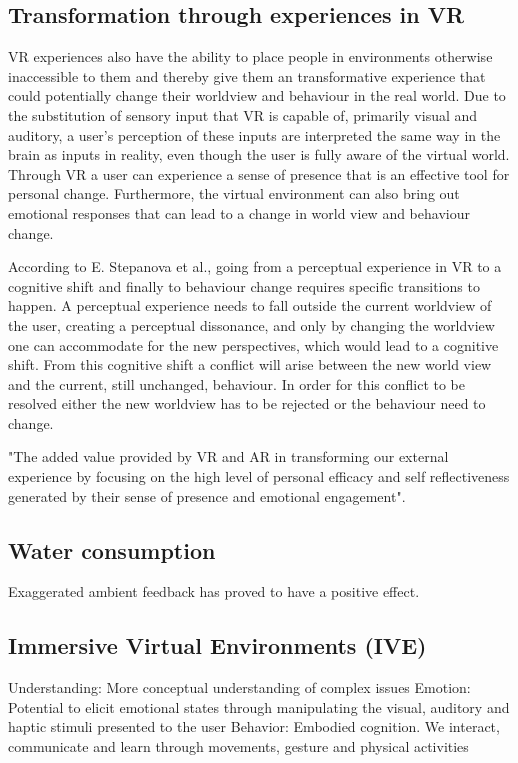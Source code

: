     \subsection{Transformation through experiences in VR}
    VR experiences also have the ability to place people in environments otherwise inaccessible to them\cite{vrCapabilitiesSlater} and thereby give them an transformative experience that could potentially change their worldview and behaviour in the real world\cite{transformativeVR}. Due to the substitution of sensory input that VR is capable of, primarily visual and auditory, a user's perception of these inputs are interpreted the same way in the brain as inputs in reality, even though the user is fully aware of the virtual world\cite{vrCapabilitiesSlater}. Through VR a user can experience a sense of presence that is an effective tool for personal change\cite{riva2016transforming}. Furthermore, the virtual environment can also bring out emotional responses that can lead to a change in world view and behaviour change\cite{transformativeVR}.
    
    According to E. Stepanova et al., going from a perceptual experience in VR to a cognitive shift and finally to behaviour change requires specific transitions to happen\cite{transformativeVR}. A perceptual experience needs to fall outside the current worldview of the user, creating a perceptual dissonance, and only by changing the worldview one can accommodate for the new perspectives, which would lead to a cognitive shift. From this cognitive shift a conflict will arise between the new world view and the current, still unchanged, behaviour. In order for this conflict to be resolved either the new worldview has to be rejected or the behaviour need to change\cite{transformativeVR}.
    
    
    "The added value provided by VR and AR in transforming our external experience by focusing on the high level of personal efficacy and self reflectiveness generated by their sense of presence and emotional engagement"\cite{riva2016transforming}.\\
    
    
    
    \subsection{Water consumption}
    Exaggerated ambient feedback has proved to have a positive effect.\cite{waterConsumption}
    
    \subsection{Immersive Virtual Environments (IVE)}
    Understanding: More conceptual understanding of complex issues\cite{vrEngagementClimateChange}
    Emotion: Potential to elicit emotional states through manipulating the visual, auditory and haptic stimuli presented to the user
    Behavior: Embodied cognition. We interact, communicate and learn through movements, gesture and physical activities
    
